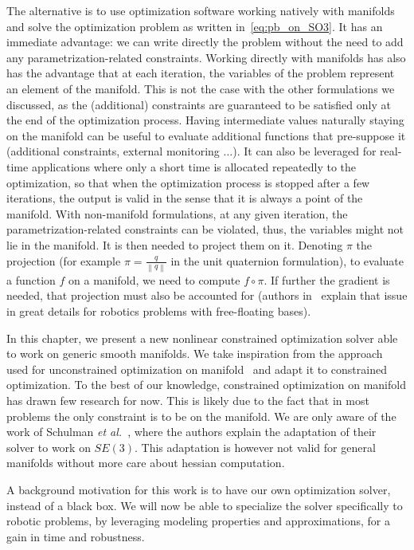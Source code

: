 The alternative is to use optimization software working natively with manifolds~\cite{brossette:Humanoids:2015}\cite{absil:book:2008} and solve the optimization problem as written in~\ref{eq:pb_on_SO3}.
It has an immediate advantage: we can write directly the problem without the need to add any parametrization-related constraints.
Working directly with manifolds has also has the advantage that at each iteration, the variables of the problem represent an element of the manifold.
This is not the case with the other formulations we discussed, as the (additional) constraints are guaranteed to be satisfied only at the end of the optimization process.
Having intermediate values naturally staying on the manifold can be useful to evaluate additional functions that pre-suppose it (additional constraints, external monitoring $\ldots$).
It can also be leveraged for real-time applications where only a short time is allocated repeatedly to the optimization, so that when the optimization process is stopped after a few iterations, the output is valid in the sense that it is always a point of the manifold.
With non-manifold formulations, at any given iteration, the parametrization-related constraints can be violated, thus, the variables might not lie in the manifold. It is then needed to project them on it. Denoting $\pi$ the projection (for example $\pi = \frac{q}{\left\|q\right\|}$ in the unit quaternion formulation), to evaluate a function $f$ on a manifold, we need to compute $f \circ \pi$. If further the gradient is needed, that projection must also be accounted for (authors in~\cite{bouyarmane:humanoids:2012} explain that issue in great details for robotics problems with free-floating bases).

In this chapter, we present a new nonlinear constrained optimization solver able to work on generic smooth manifolds.
We take inspiration from the approach used for unconstrained optimization on manifold~\cite{absil:book:2008} and adapt it to constrained optimization.
To the best of our knowledge, constrained optimization on manifold has drawn few research for now.
This is likely due to the fact that in most problems the only constraint is to be on the manifold.
We are only aware of the work of Schulman \emph{et al.}~\cite{Schulman2014}, where the authors explain the adaptation of their solver to work on $SE(3)$.
This adaptation is however not valid for general manifolds without more care about hessian computation.

A background motivation for this work is to have our own optimization solver, instead of a black box.
We will now be able to specialize the solver specifically to robotic problems, by leveraging modeling properties and approximations, for a gain in time and robustness.

